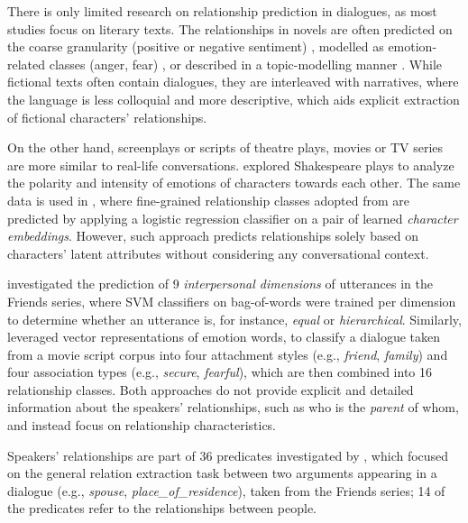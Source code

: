 There is only limited research on relationship prediction in dialogues, as most studies focus on literary texts. The relationships in novels are often predicted on the coarse granularity (positive or negative sentiment) \cite{chaturvedi2016modeling}, modelled as emotion-related classes (anger, fear) \cite{kim2019frowning}, or described in a topic-modelling manner \cite{iyyer2016feuding, chaturvedi2017unsupervised}. While fictional texts often contain dialogues, they are interleaved with narratives, where the language is less colloquial and more descriptive, which aids explicit extraction of fictional characters' relationships.

On the other hand, screenplays or scripts of theatre plays, movies or TV series are more similar to real-life conversations. 
\citet{nalisnick2013character} explored Shakespeare plays to analyze the polarity and intensity of emotions of characters towards each other. The same data is used in \citet{azab2019representing}, where fine-grained relationship classes adopted from \citet{massey2015annotating} are predicted by applying a logistic regression classifier on a pair of learned \emph{character embeddings}.
However, such approach predicts relationships solely based on characters' latent attributes without considering any conversational context.

\citet{rashid2018characterizing} investigated the prediction of 9 \emph{interpersonal dimensions} \cite{wish1976perceived} of utterances in the Friends series, 
where SVM classifiers on bag-of-words were trained per dimension to determine whether an utterance is, for instance, \emph{equal} or \emph{hierarchical}. 
Similarly, \citet{qamar2021relationship} leveraged vector representations of emotion
words, to classify a dialogue taken from a movie script corpus into four attachment styles (e.g., \emph{friend}, \emph{family}) and four association types (e.g., \emph{secure}, \emph{fearful}), which are then combined into 16 relationship classes. Both approaches do not provide explicit and detailed information about the speakers' relationships, such as who is the \emph{parent} of whom, and instead focus on relationship characteristics.

Speakers' relationships are part of 36 predicates investigated by \citet{yu-etal-2020-dialogue}, which focused on the general relation extraction task between two arguments appearing in a dialogue (e.g., \emph{spouse}, \emph{place\_of\_residence}), taken from the Friends series; 14 of the predicates refer to the relationships between people.
